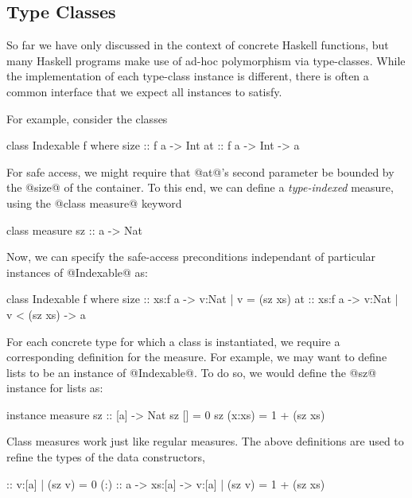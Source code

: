 \subsection{Type Classes}\label{sec:type-classes}

So far we have only discussed \toolname in the context of 
concrete Haskell functions, but many Haskell programs make
use of ad-hoc polymorphism via type-classes.
%
While the implementation of each type-class instance is 
different, there is often a common interface that we 
expect all instances to satisfy.

For example, consider the classes
%
\begin{code}
  class Indexable f where
    size :: f a -> Int
    at   :: f a -> Int -> a
\end{code}
%
For safe access, we might require that @at@'s second 
parameter be bounded by the @size@ of the container.
To this end, we can define a \emph{type-indexed} 
measure, using the @class measure@ keyword
%
\begin{code}
  class measure sz :: a -> Nat
\end{code}
%
Now, we can specify the safe-access preconditions  
independant of particular instances of @Indexable@ 
as:
%
\begin{code}
  class Indexable f where
    size :: xs:f a -> {v:Nat | v = (sz xs)}
    at   :: xs:f a -> {v:Nat | v < (sz xs)} -> a
\end{code}

For each concrete type for which a class is instantiated, we require 
a corresponding definition for the measure. For example, we may want
to define lists to be an instance of @Indexable@. To do so, we would
define the @sz@ instance for lists as:
%
\begin{code}
  instance measure sz :: [a] -> Nat
  sz []     = 0
  sz (x:xs) = 1 + (sz xs)
\end{code}
%
%
Class measures work just like regular measures. 
The above definitions are used to refine the types 
of the data constructors, \eg
%
\begin{code}
  []  :: {v:[a] | (sz v) = 0}
  (:) :: a -> xs:[a] 
      -> {v:[a] | (sz v) = 1 + (sz xs)}
\end{code}

